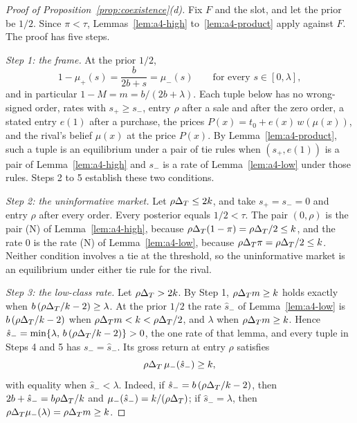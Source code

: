 \begin{proof}[Proof of Proposition~\ref{prop:coexistence}(d)]
Fix \(F\) and the slot, and let the prior be \(1/2\). Since \(\pi<\tau\), Lemmas~\ref{lem:a4-high} to~\ref{lem:a4-product}
apply against \(F\). The proof has five steps.

\emph{Step 1: the frame.} At the prior \(1/2\),
\[
1-\mu_+(s)=\frac{b}{2b+s}=\mu_-(s)\qquad\text{for every }s\in[0,\lambda],
\]
and in particular \(1-M=m=b/(2b+\lambda)\). Each tuple below has no wrong-signed order, rates with \(s_+\ge s_-\),
entry \(\rho\) after a sale and after the zero order, a stated entry \(e(1)\) after a purchase, the prices
\(P(x)=t_0+e(x)\,w(\mu(x))\), and the rival's belief \(\mu(x)\) at the price \(P(x)\). By
Lemma~\ref{lem:a4-product}, such a tuple is an equilibrium under a pair of tie rules when \((s_+,e(1))\) is a pair of
Lemma~\ref{lem:a4-high} and \(s_-\) is a rate of Lemma~\ref{lem:a4-low} under those rules. Steps 2 to 5 establish these
two conditions.

\emph{Step 2: the uninformative market.} Let \(\rho\Delta_T\le2k\), and take \(s_+=s_-=0\) and entry \(\rho\) after every order.
Every posterior equals \(1/2<\tau\). The pair \((0,\rho)\) is the pair (N) of Lemma~\ref{lem:a4-high}, because
\(\rho\Delta_T(1-\pi)=\rho\Delta_T/2\le k\), and the rate \(0\) is the rate (N) of Lemma~\ref{lem:a4-low}, because
\(\rho\Delta_T\pi=\rho\Delta_T/2\le k\). Neither condition involves a tie at the threshold, so the uninformative market is an
equilibrium under either tie rule for the rival.

\emph{Step 3: the low-class rate.} Let \(\rho\Delta_T>2k\). By Step 1, \(\rho\Delta_T m\ge k\) holds exactly when
\(b\,(\rho\Delta_T/k-2)\ge\lambda\). At the prior \(1/2\) the rate \(\hat s_-\) of Lemma~\ref{lem:a4-low} is
\(b\,(\rho\Delta_T/k-2)\) when \(\rho\Delta_T m<k<\rho\Delta_T/2\), and \(\lambda\) when \(\rho\Delta_T m\ge k\). Hence
\(\hat s_-=\min\{\lambda,\,b\,(\rho\Delta_T/k-2)\}>0\), the one rate of that lemma, and every tuple in Steps 4 and 5 has
\(s_-=\hat s_-\). Its gross return at entry \(\rho\) satisfies
\begin{equation}\label{eq:o5-sale}
\rho\Delta_T\,\mu_-(\hat s_-)\ge k ,
\end{equation}
with equality when \(\hat s_-<\lambda\). Indeed, if \(\hat s_-=b\,(\rho\Delta_T/k-2)\), then \(2b+\hat s_-=b\rho\Delta_T/k\) and
\(\mu_-(\hat s_-)=k/(\rho\Delta_T)\); if \(\hat s_-=\lambda\), then \(\rho\Delta_T\mu_-(\lambda)=\rho\Delta_T m\ge k\).


\end{proof}
